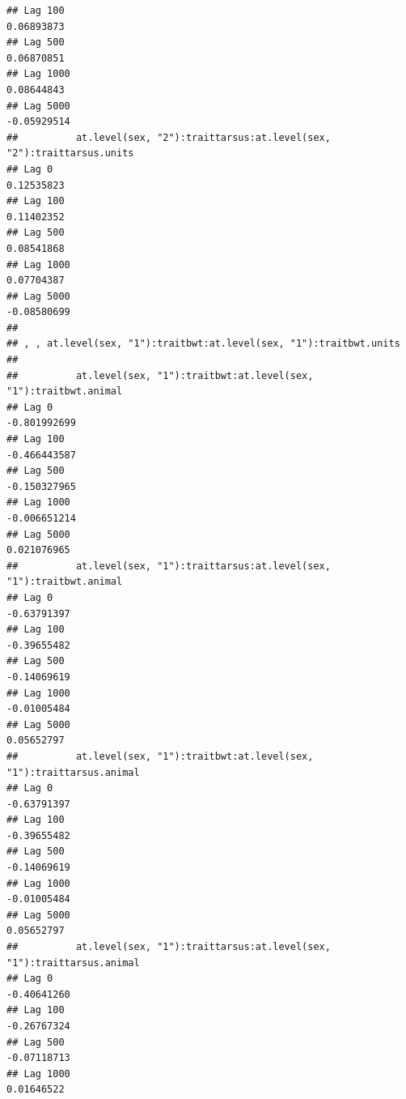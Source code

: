 \documentclass[
  12pt,
]{book}
\begin{document}
\begin{verbatim}
## Lag 100                                                        0.06893873
## Lag 500                                                        0.06870851
## Lag 1000                                                       0.08644843
## Lag 5000                                                      -0.05929514
##          at.level(sex, "2"):traittarsus:at.level(sex, "2"):traittarsus.units
## Lag 0                                                             0.12535823
## Lag 100                                                           0.11402352
## Lag 500                                                           0.08541868
## Lag 1000                                                          0.07704387
## Lag 5000                                                         -0.08580699
## 
## , , at.level(sex, "1"):traitbwt:at.level(sex, "1"):traitbwt.units
## 
##          at.level(sex, "1"):traitbwt:at.level(sex, "1"):traitbwt.animal
## Lag 0                                                      -0.801992699
## Lag 100                                                    -0.466443587
## Lag 500                                                    -0.150327965
## Lag 1000                                                   -0.006651214
## Lag 5000                                                    0.021076965
##          at.level(sex, "1"):traittarsus:at.level(sex, "1"):traitbwt.animal
## Lag 0                                                          -0.63791397
## Lag 100                                                        -0.39655482
## Lag 500                                                        -0.14069619
## Lag 1000                                                       -0.01005484
## Lag 5000                                                        0.05652797
##          at.level(sex, "1"):traitbwt:at.level(sex, "1"):traittarsus.animal
## Lag 0                                                          -0.63791397
## Lag 100                                                        -0.39655482
## Lag 500                                                        -0.14069619
## Lag 1000                                                       -0.01005484
## Lag 5000                                                        0.05652797
##          at.level(sex, "1"):traittarsus:at.level(sex, "1"):traittarsus.animal
## Lag 0                                                             -0.40641260
## Lag 100                                                           -0.26767324
## Lag 500                                                           -0.07118713
## Lag 1000                                                           0.01646522

\end{verbatim}
\end{document}
